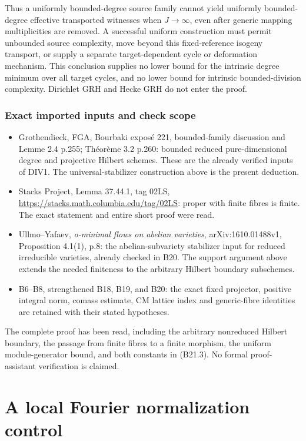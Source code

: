 \documentclass[11pt,a4paper]{article}
\providecommand{\tightlist}{\setlength{\itemsep}{0pt}\setlength{\parskip}{0pt}}
\theoremstyle{definition}
\begin{document}
Thus a uniformly bounded-degree source family cannot yield uniformly bounded-degree effective transported witnesses when \(J\to\infty\), even after generic mapping multiplicities are removed. A successful uniform construction must permit unbounded source complexity, move beyond this fixed-reference isogeny transport, or supply a separate target-dependent cycle or deformation mechanism. This conclusion supplies no lower bound for the intrinsic degree minimum over all target cycles, and no lower bound for intrinsic bounded-division complexity. Dirichlet GRH and Hecke GRH do not enter the proof.

\subsubsection{Exact imported inputs and check scope}\label{exact-imported-inputs-and-check-scope}

\begin{itemize}
\tightlist
\item
  Grothendieck, FGA, Bourbaki exposé 221, bounded-family discussion and Lemme 2.4 p.255; Théorème 3.2 p.260: bounded reduced pure-dimensional degree and projective Hilbert schemes. These are the already verified inputs of DIV1. The universal-stabilizer construction above is the present deduction.
\item
  Stacks Project, Lemma 37.44.1, tag 02LS, \url{https://stacks.math.columbia.edu/tag/02LS}: proper with finite fibres is finite. The exact statement and entire short proof were read.
\item
  Ullmo--Yafaev, \emph{o-minimal flows on abelian varieties}, arXiv:1610.01488v1, Proposition 4.1(1), p.8: the abelian-subvariety stabilizer input for reduced irreducible varieties, already checked in B20. The support argument above extends the needed finiteness to the arbitrary Hilbert boundary subschemes.
\item
  B6--B8, strengthened B18, B19, and B20: the exact fixed projector, positive integral norm, comass estimate, CM lattice index and generic-fibre identities are retained with their stated hypotheses.
\end{itemize}

The complete proof has been read, including the arbitrary nonreduced Hilbert boundary, the passage from finite fibres to a finite morphism, the uniform module-generator bound, and both constants in (B21.3). No formal proof-assistant verification is claimed.

\section{A local Fourier normalization control}
\end{document}
